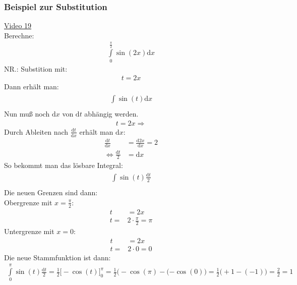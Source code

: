 \subsubsection{Beispiel zur Substitution}
\href{https://youtu.be/JLzCF3VnqkU}{Video 19}\\
Berechne:\\
\begin{align*}
\int\limits_{0}^{\frac{\pi}{2}}  \sin(2x) \mathrm{d}x
\end{align*}
NR.: Substition mit:
\begin{align*}
t=2x
\end{align*}
Dann erhält man:\\
\begin{align*}
\int\limits_{}^{} \sin(t)\mathrm{d}x
\end{align*}
Nun muß noch $ \mathrm{d}x $ von $ \mathrm{d}t $ abhängig werden.\\
\begin{align*}
t=2x\Rightarrow 
\end{align*}
Durch Ableiten nach $ \frac{\mathrm{d}t}{\mathrm{d}x} $ erhält man $ \mathrm{d}x $:\\
\begin{align*}
\frac{\mathrm{d}t}{\mathrm{d}x}&=\frac{\mathrm{d}2x}{\mathrm{d}x}=2\\
\Leftrightarrow\frac{\mathrm{d}t}{2}&=\mathrm{d}x
\end{align*}
So bekommt man das lösbare Integral:\\
\begin{align*}
\int\limits_{}^{} \sin(t)\frac{\mathrm{d}t}{2}
\end{align*}
Die neuen Grenzen sind dann:\\
Obergrenze mit $ x=\frac{\pi}{2} $:\\
\begin{align*}
t&=2x\\
t=&2\cdot \frac{\pi}{2}=\pi
\end{align*}
Untergrenze mit $x= 0 $:\\
\begin{align*}
t&=2x\\
t=&2\cdot 0=0
\end{align*}
Die neue Stammfunktion ist dann:\\
\begin{align*}
\int\limits_{0}^{\pi}\sin(t) \frac{\mathrm{d}t}{2}=\frac{1}{2}\bigg[-\cos(t)\bigg]^\pi_0=\frac{1}{2}\big(-\cos(\pi)-(-\cos(0)\big)=\frac{1}{2}\big(+1-(-1)\big)=\frac{2}{2}=1\\
\end{align*}
